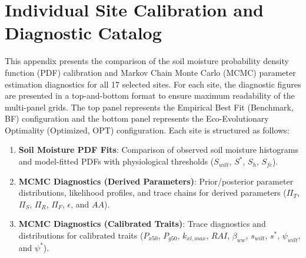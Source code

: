 \documentclass[11pt,a4paper]{article}
\begin{document}
\newpage
\appendix
\section{Individual Site Calibration and Diagnostic Catalog}
This appendix presents the comparison of the soil moisture probability density function (PDF) calibration and Markov Chain Monte Carlo (MCMC) parameter estimation diagnostics for all 17 selected sites. For each site, the diagnostic figures are presented in a top-and-bottom format to ensure maximum readability of the multi-panel grids. The top panel represents the Empirical Best Fit (Benchmark, BF) configuration and the bottom panel represents the Eco-Evolutionary Optimality (Optimized, OPT) configuration. Each site is structured as follows:
\begin{enumerate}
  \item \textbf{Soil Moisture PDF Fits}: Comparison of observed soil moisture histograms and model-fitted PDFs with physiological thresholds ($S_{wilt}$, $S^*$, $S_h$, $S_{fc}$).
  \item \textbf{MCMC Diagnostics (Derived Parameters)}: Prior/posterior parameter distributions, likelihood profiles, and trace chains for derived parameters ($\Pi_T$, $\Pi_S$, $\Pi_R$, $\Pi_F$, $\epsilon$, and $AA$).
  \item \textbf{MCMC Diagnostics (Calibrated Traits)}: Trace diagnostics and distributions for calibrated traits ($P_{x50}$, $P_{g50}$, $k_{xl,max}$, $RAI$, $\beta_{ww}$, $s_{wilt}$, $s^*$, $\psi_{wilt}$, and $\psi^*$).
\end{enumerate}
\newpage
\end{document}
